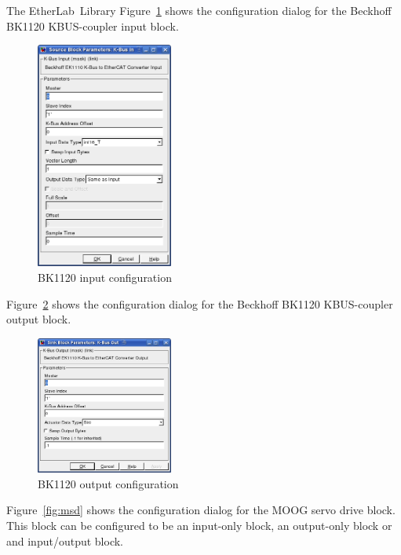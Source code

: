 \begin{ighsec}{The EtherLab\regTM\ Library}
Figure~\ref{fig:bk1120-in} shows the configuration dialog for the Beckhoff
BK1120 KBUS-coupler input block.

\begin{figure}[H]
  \begin{center}
    \includegraphics[width=0.4\textwidth]{images/bk1120-in.png}
    \caption{BK1120 input configuration}
    \label{fig:bk1120-in}
  \end{center}
\end{figure}

Figure~\ref{fig:bk1120-out} shows the configuration dialog for the Beckhoff
BK1120 KBUS-coupler output block.

\begin{figure}[H]
  \begin{center}
    \includegraphics[width=0.4\textwidth]{images/bk1120-out.png}
    \caption{BK1120 output configuration}
    \label{fig:bk1120-out}
  \end{center}
\end{figure}

Figure~\ref{fig:msd} shows the configuration dialog for the MOOG servo drive
block. This block can be configured to be an input-only block, an output-only
block or and input/output block.


\end{ighsec}
